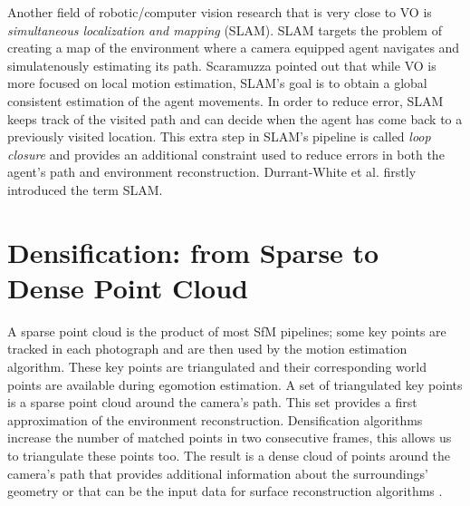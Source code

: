 Another field of robotic/computer vision research that is very close to VO is \textit{simultaneous localization and mapping} (SLAM). SLAM targets the problem of creating a map of the environment where a camera equipped agent navigates and simulatenously estimating its path. Scaramuzza\cite{scaramuzzaVisualOdometryI} pointed out that while VO is more focused on local motion estimation, SLAM's goal is to obtain a global consistent estimation of the agent movements.
%
In order to reduce error, SLAM keeps track of the visited path and can decide when the agent has come back to a previously visited location. This extra step in SLAM's pipeline is called \textit{loop closure} and provides an additional constraint used to reduce errors in both the agent's path and 
environment reconstruction. Durrant-White et al.\cite{durrant1996localization} firstly introduced the term SLAM.

%
%
 
\section{Densification: from Sparse to Dense Point Cloud}
A sparse point cloud is the product of most SfM pipelines; some key points are tracked in each photograph and are then used by the motion estimation algorithm. These key points are triangulated and their corresponding world points are available during egomotion estimation.
%
A set of triangulated key points is a sparse point cloud around the camera's path. This set provides a first approximation of the environment reconstruction.
Densification algorithms increase the number of matched points in two consecutive frames, this allows us to triangulate these points too. The result is a dense cloud of points around the camera's path that provides additional information about the surroundings' geometry or that can 
be the input data for surface reconstruction algorithms 
\cite{seitz2006comparison}.

